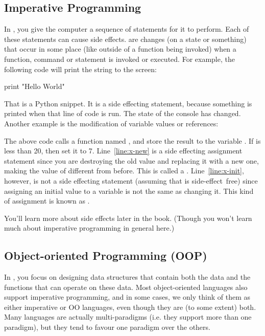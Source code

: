 \subsection{Imperative Programming}
In , you give the computer a sequence of statements for it to perform. Each of these statements can cause side effects.  are changes (on a state or something) that occur in some place (like outside of a function being invoked) when a function, command or statement is invoked or executed. For example, the following code will print the string  to the screen:
\begin{Python}
	print "Hello World"
\end{Python}
That is a Python snippet. It is a side effecting statement, because something is printed when that line of code is run. The state of the console has changed. Another example is the modification of variable values or references: 
\begin{Python}
	x = function_that_returns_int() (*@\label{line:x-init}@*)
	if x < 20:
		x = 7 (*@{\label{line:x-new}@*)
\end{Python}
The above code calls a function named , and store the result to the variable . If  is less than 20, then set it to 7. Line~\ref{line:x-new} is a side effecting assignment statement since you are destroying the old value and replacing it with a new one, making the value of  different from before. This is called a . Line~\ref{line:x-init}, however, is not a side effecting statement (assuming that  is side-effect~free) since assigning an initial value to a variable is not the same as changing it. This kind of assignment is known as .

You'll learn more about side effects later in the book. (Though you won't learn much about imperative programming in general here.)

\subsection{Object-oriented Programming (OOP)}
In , you focus on designing data structures that contain both the data and the functions that can operate on these data. Most object-oriented languages also support imperative programming, and in some cases, we only think of them as either imperative  or OO languages, even though they are (to some extent) both. Many languages are actually multi-paradigms (i.e. they support more than one paradigm), but they tend to favour one paradigm over the others. 

